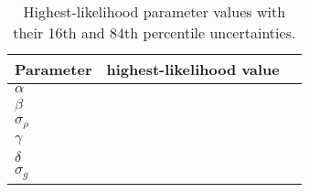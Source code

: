 \begin{table}
\caption{Highest-likelihood parameter values with their 16th and 84th
	percentile uncertainties.}
\begin{tabular}{lcc}
\hline\hline
    Parameter & highest-likelihood value \\
    \hline
    $\alpha$         &   \\
    $\beta$          &   \\
    $\sigma_{\rho}$  &   \\
    $\gamma$         &   \\
    $\delta$         &   \\
    $\sigma_{g}$     &   \\
    \hline
\end{tabular}
\end{table}

